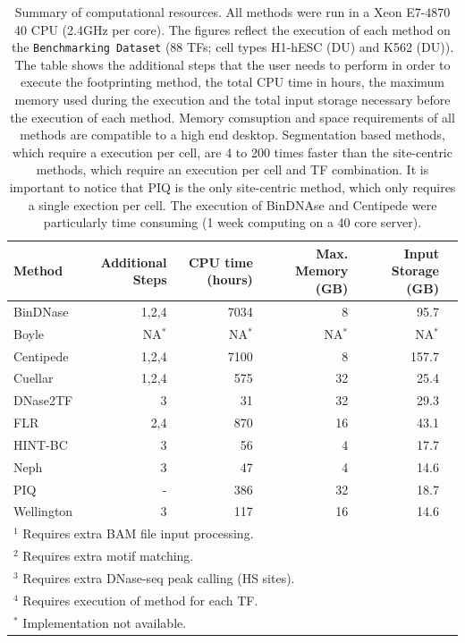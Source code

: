 \documentclass[11pt]{article}
\begin{document}
\clearpage


\setcounter{table}{0}

\begin{table}[h]
\begin{center}
\caption{Summary of computational resources. All methods were run in a Xeon E7-4870 40 CPU (2.4GHz per core). The figures reflect the execution of each method on the {\tt Benchmarking Dataset} (88 TFs; cell types H1-hESC (DU) and K562 (DU)). The table shows the additional steps that the user needs to perform in order to execute the footprinting method, the total CPU time in hours, the maximum memory used during the execution and the total input storage necessary before the execution of each method. Memory comsuption and space requirements of all methods are compatible to a high end desktop. Segmentation based methods, which require a execution per cell, are 4 to 200 times faster than the site-centric methods, which require an execution per cell and TF combination. It is important to notice that PIQ is the only site-centric method, which only requires a single exection per cell. The execution of BinDNAse and Centipede were particularly time consuming (1 week computing on a 40 core server).}
\label{tab:comp.resource}
\renewcommand{\arraystretch}{1.2}
\begin{tabularx}{\textwidth}{ lrrrrr }
\hline
Method & Additional Steps & CPU time (hours) & Max. Memory (GB) & Input Storage (GB) \\
\hline
BinDNase & 1,2,4 & 7034 & 8 & 95.7 \\
Boyle & NA$^*$ & NA$^*$ & NA$^*$ & NA$^*$ \\
Centipede & 1,2,4 & 7100 & 8 & 157.7 \\
Cuellar & 1,2,4 & 575 & 32 & 25.4 \\
DNase2TF & 3 & 31 & 32 & 29.3 \\
FLR & 2,4 & 870 & 16 & 43.1 \\
HINT-BC & 3 & 56 & 4 & 17.7 \\
Neph & 3 & 47 & 4 & 14.6 \\
PIQ & - & 386 & 32 & 18.7 \\
Wellington & 3 & 117 & 16 & 14.6 \\
\hline
\multicolumn{6}{l}{$^1$ Requires extra BAM file input processing.} \\
\multicolumn{6}{l}{$^2$ Requires extra motif matching.} \\
\multicolumn{6}{l}{$^3$ Requires extra DNase-seq peak calling (HS sites).} \\
\multicolumn{6}{l}{$^4$ Requires execution of method for each TF.} \\
\multicolumn{6}{l}{$^*$ Implementation not available.} \\
\end{tabularx}
\end{center}
\end{table}
\end{document}
